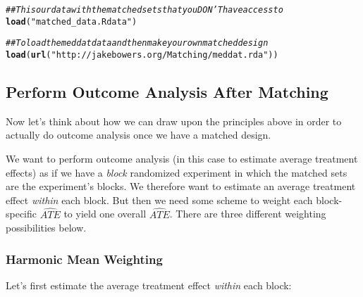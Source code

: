 \documentclass[11pt,leqno]{article}\usepackage[]{graphicx}\usepackage[]{color}
\makeatletter
\newcommand{\hlstr}[1]{\textcolor[rgb]{0.192,0.494,0.8}{#1}}%
\newcommand{\hlcom}[1]{\textcolor[rgb]{0.678,0.584,0.686}{\textit{#1}}}%
\newcommand{\hlstd}[1]{\textcolor[rgb]{0.345,0.345,0.345}{#1}}%
\newcommand{\hlkwd}[1]{\textcolor[rgb]{0.737,0.353,0.396}{\textbf{#1}}}%
\newenvironment{kframe}{%
 \def\at@end@of@kframe{}%
 \ifinner\ifhmode%
  \def\at@end@of@kframe{\end{minipage}}%
  \begin{minipage}{\columnwidth}%
 \fi\fi%
 \def\FrameCommand##1{\hskip\@totalleftmargin \hskip-\fboxsep
 \colorbox{shadecolor}{##1}\hskip-\fboxsep
     \hskip-\linewidth \hskip-\@totalleftmargin \hskip\columnwidth}%
 \MakeFramed {\advance\hsize-\width
   \@totalleftmargin\z@ \linewidth\hsize
   \@setminipage}}%
 {\par\unskip\endMakeFramed%
 \at@end@of@kframe}
\newenvironment{knitrout}{}{} %
\theoremstyle{newstyle}
\makeatother
\begin{document}
\begin{knitrout}\footnotesize
{}\color{fgcolor}\begin{kframe}
\begin{alltt}
\hlcom{## This our data with the matched sets that you DON'T have access to}
\hlkwd{load}\hlstd{(}\hlstr{"matched_data.Rdata"}\hlstd{)}
\end{alltt}
\end{kframe}
\end{knitrout}

\begin{knitrout}\footnotesize
{}\color{fgcolor}\begin{kframe}
\begin{alltt}
\hlcom{## To load the meddat data and then make your own matched design}
\hlkwd{load}\hlstd{(}\hlkwd{url}\hlstd{(}\hlstr{"http://jakebowers.org/Matching/meddat.rda"}\hlstd{))}
\end{alltt}
\end{kframe}
\end{knitrout}

\subsection{Perform Outcome Analysis After Matching}

Now let's think about how we can draw upon the principles above in order to actually do outcome analysis once we have a matched design.

We want to perform outcome analysis (in this case to estimate average treatment effects) as if we have a \textit{block} randomized experiment in which the matched sets are the experiment's blocks. We therefore want to estimate an average treatment effect \textit{within} each block. But then we need some scheme to weight each block-specific $\widehat{ATE}$ to yield one overall $\widehat{ATE}$. There are three different weighting possibilities below.

\subsubsection{Harmonic Mean Weighting}

Let's first estimate the average treatment effect \textit{within} each block:
\end{document}
